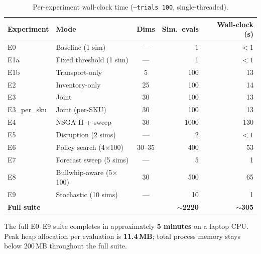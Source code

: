 \begin{table}[H]
  \centering
  \caption{Per-experiment wall-clock time (\texttt{--trials~100}, single-threaded).}
  \label{tab:rt-per-exp}
  \begin{tabular}{@{}llcrr@{}}
    \toprule
    Experiment & Mode & Dims & Sim.\ evals & Wall-clock (s) \\
    \midrule
    E0  & Baseline (1 sim)                 & ---    &    1 &  $<1$ \\
    E1a & Fixed threshold (1 sim)          & ---    &    1 &  $<1$ \\
    E1b & Transport-only                   & 5      &  100 &   13  \\
    E2  & Inventory-only                   & 25     &  100 &   14  \\
    E3  & Joint                            & 30     &  100 &   13  \\
    E3\_per\_sku & Joint (per-SKU)         & 30     &  100 &   13  \\
    E4  & NSGA-II + sweep                  & 30     & 1000 &  130  \\
    E5  & Disruption (2 sims)              & ---    &    2 &  $<1$ \\
    E6  & Policy search (4$\times$100)     & 30--35 &  400 &   53  \\
    E7  & Forecast sweep (5 sims)          & ---    &    5 &    1  \\
    E8  & Bullwhip-aware (5$\times$100)    & 30     &  500 &   65  \\
    E9  & Stochastic (10 sims)             & ---    &   10 &    1  \\
    \midrule
    \textbf{Full suite} & & & \textbf{$\sim$2220} & \textbf{$\sim$305} \\
    \bottomrule
  \end{tabular}
\end{table}

The full E0--E9 suite completes in approximately \textbf{5 minutes} on
a laptop CPU.  Peak heap allocation per evaluation is \textbf{11.4\,MB};
total process memory stays below 200\,MB throughout the full suite.

